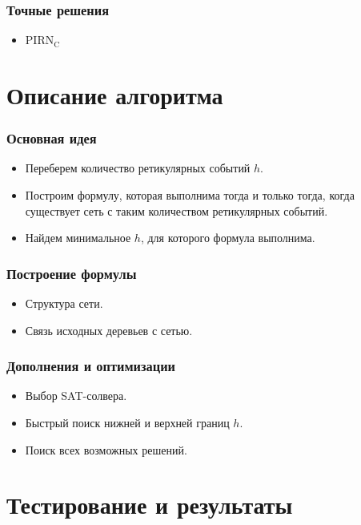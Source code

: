 \documentclass[hyperref={unicode}]{beamer}
\begin{document}
\begin{frame}
\frametitle{Точные решения}

\begin{itemize}
	\item $\mathrm{PIRN_C}$
\end{itemize}

\end{frame}

\section{Описание алгоритма}

\begin{frame}
\frametitle{Основная идея}

\begin{itemize}
	\item Переберем количество ретикулярных событий $h$.
	\item Построим формулу, которая выполнима тогда и только тогда, когда существует сеть с таким количеством ретикулярных событий.
	\item Найдем минимальное $h$, для которого формула выполнима.
\end{itemize}

\end{frame}


\begin{frame}
\frametitle{Построение формулы}

\begin{itemize}
	\item Структура сети.
	\item Связь исходных деревьев с сетью.
\end{itemize}

\end{frame}

\begin{frame}
\frametitle{Дополнения и оптимизации}

\begin{itemize}
	\item Выбор SAT-солвера.
	\item Быстрый поиск нижней и верхней границ $h$.
	\item Поиск всех возможных решений.
\end{itemize}

\end{frame}

\section{Тестирование и результаты}
\end{document}
